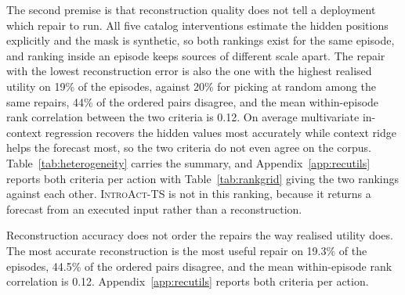 \documentclass{article}
\newcommand{\introact}{\textsc{IntroAct-TS}}
\begin{document}
The second premise is that reconstruction quality does not tell a deployment which repair to
run. All five catalog interventions estimate the hidden positions explicitly and the mask is
synthetic, so both rankings exist for the same episode, and ranking inside an episode keeps
sources of different scale apart. The repair with the lowest reconstruction error is also the one with the highest realised utility on 19\% of the episodes, against 20\% for picking at random among the same repairs, 44\% of the ordered pairs disagree, and the mean within-episode rank correlation between the two criteria is 0.12. On average multivariate in-context regression recovers the hidden values most accurately while context ridge helps the forecast most, so the two criteria do not even agree on the corpus. Table~\ref{tab:heterogeneity} carries
the summary, and Appendix~\ref{app:recutils} reports both criteria per action with
Table~\ref{tab:rankgrid} giving the two rankings against each other. \introact{} is not in this ranking, because
it returns a forecast from an executed input rather than a reconstruction.

\begin{table}[t]
  \caption{Why the choice has to be made per request, over the held-out episodes of all three
  backbones. Oracle-best share is how often an action attains the lowest realised loss of the
  catalog and the shares sum to one. The last two columns cover the episodes where the action
  applies and are measured against \textsc{Keep}.}
  \label{tab:heterogeneity}
  \centering
  \small
  \setlength{\tabcolsep}{4pt}
  \vspace{-2pt}
  {\footnotesize Reconstruction accuracy does not order the repairs the way realised utility
  does. The most accurate reconstruction is the most useful repair on 19.3\% of the
  episodes, 44.5\% of the ordered pairs disagree, and the mean within-episode
  rank correlation is 0.12. Appendix~\ref{app:recutils} reports both criteria per
  action.}
\end{table}
\end{document}
